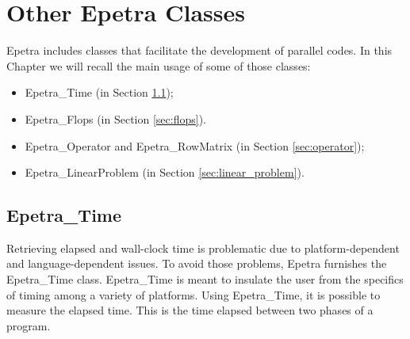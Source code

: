 % 
% 
% 
%  
%  
% 

\section{Other Epetra Classes}
\label{chap:epetra_others}

Epetra includes classes that facilitate the development of parallel
codes. In this Chapter we will recall the main usage of some of those
classes:
\begin{itemize}
\item Epetra\_Time (in Section \ref{sec:time});
\item Epetra\_Flops (in Section \ref{sec:flops}).
\item Epetra\_Operator and Epetra\_RowMatrix (in Section \ref{sec:operator});
\item Epetra\_LinearProblem (in Section \ref{sec:linear_problem}).
\end{itemize}


\subsection{Epetra\_Time}
\label{sec:time}

Retrieving elapsed and wall-clock time is problematic due to
platform-dependent and language-dependent issues. To avoid those
problems, Epetra furnishes the Epetra\_Time class.  Epetra\_Time is
meant to insulate the user from the specifics of timing among a variety
of platforms.  Using Epetra\_Time, it is possible to measure the elapsed
time. This is the time elapsed between two phases of a program.

